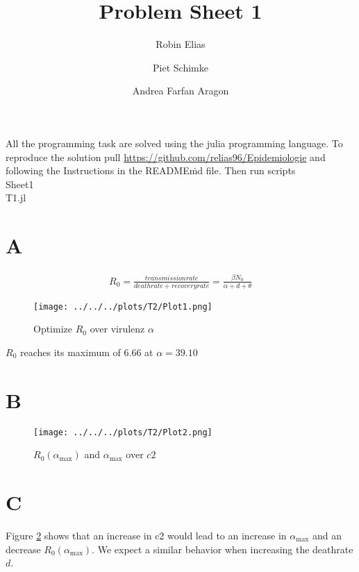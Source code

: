 \documentclass{article}
\title{Problem Sheet 1}
\author{Robin Elias \and Piet Schimke \and Andrea Farfan Aragon}
\date{}
\begin{document}
\maketitle
\begin{center}
    All the programming task are solved using the julia programming language.
    To reproduce the solution pull \href{https://github.com/relias96/Epidemiologie}{https://github.com/relias96/Epidemiologie} and following the Instructions in the README\.md file.
    Then run scripts\\Sheet1\\T1.jl
\end{center}
 
\section*{A}

\begin{equation}
    \begin{split}
        R_0 = \frac{transmissionrate}{deathrate + recoveryrate} = \frac{\beta N_0}{\alpha + d + \theta}
    \end{split}
\end{equation}

\begin{figure}[H]
    \centering
    \texttt{[image: ../../../plots/T2/Plot1.png]}
    \caption{Optimize $R_0$ over virulenz $\alpha$}\label{fig:R0}
\end{figure}

$R_0$ reaches its maximum of $6.66$ at $\alpha = 39.10$

\section*{B}
\begin{figure}[H]
    \centering
    \texttt{[image: ../../../plots/T2/Plot2.png]}
    \caption{$R_0(\alpha_{\max})$ and $\alpha_{\max}$ over $c2$ }\label{fig:c2}
\end{figure}

\section*{C}

Figure \ref*{fig:c2} shows that an increase in c2 would lead to an increase in $\alpha_{\max}$ and an decrease $R_0(\alpha_{\max})$. We expect a similar behavior when increasing the deathrate $d$.
\end{document}
